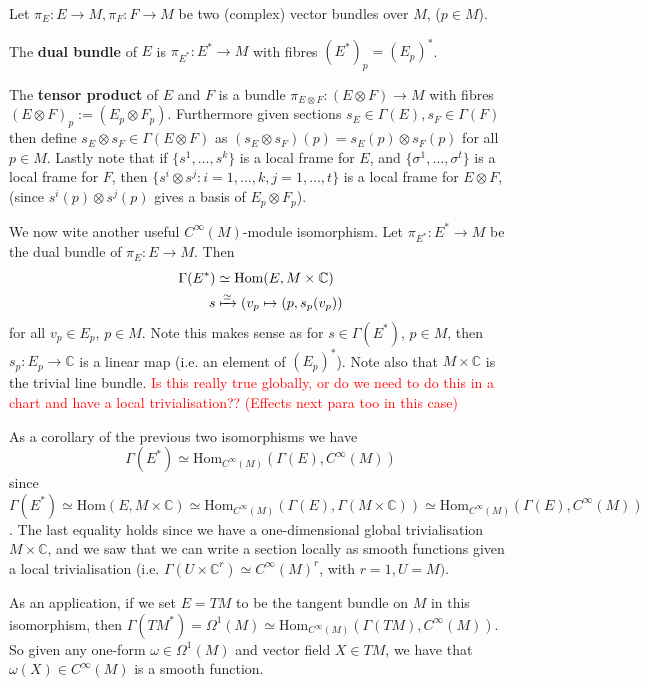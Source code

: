 \documentclass[a4paper]{article}
\theoremstyle{definition} \newtheorem*{definition}{Definition}
\theoremstyle{definition} \newtheorem*{definitions}{Definitions}
\theoremstyle{plain} \newtheorem{theorem}{Theorem}[section]
\theoremstyle{plain} \newtheorem{proposition}[theorem]{Proposition}
\theoremstyle{plain} \newtheorem{corollary}[theorem]{Corollary}
\theoremstyle{plain} \newtheorem{lemma}[theorem]{Lemma}
\theoremstyle{plain} \newtheorem{example}[theorem]{Example}
\newcommand{\checkCorrect}[1]{\textcolor{red}{#1}}
\newcommand{\defn}[1]{\textbf{#1}}
\newcommand{\complexnos}{\mathbb{C}}
\begin{document}
Let $\pi_E:E\to M, \pi_F:F\to M$ be two (complex) vector bundles over $M$, ($p\in M$).

The \defn{dual bundle} of $E$ is $\pi_{E^\ast}:E^\ast \to M$ with fibres $(E^*)_p = (E_p)^*$.

The \defn{tensor product} of $E$ and $F$ is a bundle $\pi_{E\otimes F}:(E\otimes F) \to M$ with fibres $(E\otimes F)_p:=(E_p \otimes F_p)$. Furthermore given sections $s_E\in \Gamma(E), s_F\in \Gamma(F)$ then define $s_E\otimes s_F\in \Gamma(E\otimes F)$ as $(s_E\otimes s_F)(p)=s_E(p)\otimes s_F(p)$ for all $p\in M$. Lastly note that if $\{s^1, \ldots, s^k\}$ is a local frame for $E$, and $\{\sigma^1,\ldots , \sigma^t\}$ is a local frame for $F$, then $\{s^i\otimes s^j : i=1,\ldots, k, j=1,\ldots , t\}$ is a local frame for $E\otimes F$, (since $s^i(p)\otimes s^j(p)$ gives a basis of $E_p\otimes F_p$).  

We now wite another useful $C^\infty(M)$-module isomorphism. Let $\pi_{E^\ast}:E^\ast \to M$ be the dual bundle of $\pi_E:E \to M$. Then 
\begin{align*}
\Gamma(E^\ast) & \simeq \text{Hom}(E, M\times \complexnos) \\
s & \xmapsto{\simeq} (v_p\mapsto (p, s_p(v_p))
\end{align*}
for all $v_p\in E_p$, $p\in M$. Note this makes sense as for $s\in \Gamma(E^*)$, $p\in M$, then $s_p:E_p\to \complexnos$ is a linear map (i.e. an element of $(E_p)^*$).
Note also that $M\times \complexnos$ is the trivial line bundle. \checkCorrect{Is this really true globally, or do we need to do this in a chart and have a local trivialisation?? (Effects next para too in this case)}

As a corollary of the previous two isomorphisms we have 
$$\Gamma(E^\ast)\simeq \text{Hom}_{C^\infty (M)}(\Gamma(E), C^\infty (M))$$
since $\Gamma(E^\ast) \simeq \text{Hom}(E, M\times \complexnos) \simeq \text{Hom}_{C^\infty (M)}(\Gamma(E), \Gamma(M\times \complexnos))\simeq \text{Hom}_{C^\infty (M)}(\Gamma(E), C^\infty (M))$. The last equality holds since we have a one-dimensional global trivialisation $M\times \complexnos$, and we saw that we can write a section locally as smooth functions given a local trivialisation (i.e. $\Gamma(U\times \complexnos^r)\simeq C^\infty (M)^r$, with $r=1, U=M)$.

As an application, if we set $E=TM$ to be the tangent bundle on $M$ in this isomorphism, then $\Gamma(TM^*) = \Omega^1(M) \simeq \text{Hom}_{C^\infty (M)}(\Gamma(TM), C^\infty (M))$. So given any one-form $\omega\in \Omega^1(M)$ and vector field $X\in TM$, we have that $\omega(X)\in C^\infty(M)$ is a smooth function.
\end{document}
